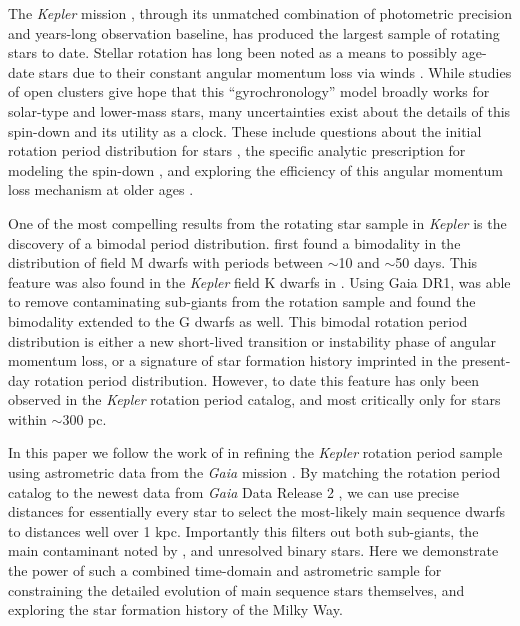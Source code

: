 \documentclass[preprint2]{aastex62}
\newcommand{\Kepler}{\textsl{Kepler}\xspace}
\begin{document}
The \Kepler mission \citep{borucki2010}, through its unmatched combination of photometric precision and years-long observation baseline, has produced the largest sample of rotating stars to date. Stellar rotation has long been noted as a means to possibly age-date stars due to their constant angular momentum loss via winds
\citep{skumanich1972}. While studies of open clusters give hope that this ``gyrochronology'' model broadly works for solar-type and lower-mass stars, many uncertainties exist about the details of this spin-down and its utility as a clock. These include questions about the initial rotation period distribution for stars \citep[e.g.][]{barnes2010,matt2015}, the specific analytic prescription for modeling the spin-down \citep{angus2015}, and exploring the efficiency of this angular momentum loss mechanism at older ages \citep{van-saders2016}.


One of the most compelling results from the rotating star sample in \Kepler is the discovery of a bimodal period distribution.
\citet{mcquillan2013} first found a bimodality in the distribution of field M dwarfs with periods between $\sim$10 and $\sim$50 days. This feature was also found in the \Kepler field K dwarfs in \citep{mcquillan2014}. Using Gaia DR1, \citet{davenport2017} was able to remove contaminating sub-giants from the rotation sample and found the bimodality extended to the G dwarfs as well. This bimodal rotation period distribution is either a new short-lived transition or instability phase of angular momentum loss, or a signature of star formation history imprinted in the present-day rotation period distribution. However, to date this feature has only been observed in the \Kepler rotation period catalog, and most critically only for stars within $\sim$300 pc.



In this paper we follow the work of \citet{davenport2017} in refining the \Kepler rotation period sample using astrometric data from the {\em Gaia} mission \citep{gaia}. By matching the \citet{mcquillan2014} rotation period catalog to the newest data from {\em Gaia} Data Release 2 \citep{gaia_dr2}, we can use precise distances for essentially every star to select the most-likely main sequence dwarfs to distances well over 1 kpc. Importantly this filters out both sub-giants, the main contaminant noted by \cite{davenport2017}, and unresolved binary stars.
Here we demonstrate the power of such a combined time-domain and astrometric sample for constraining the detailed evolution of main sequence stars themselves, and exploring the star formation history of the Milky Way.
 
\end{document}
